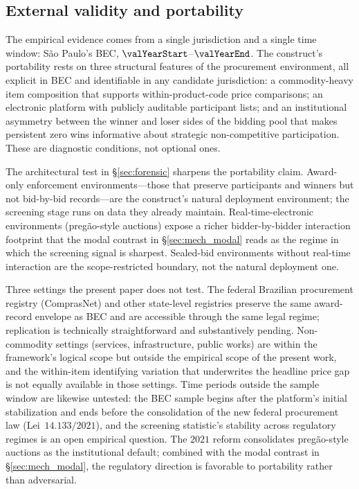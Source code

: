 \subsection{External validity and portability}
\label{sec:lim_external}

The empirical evidence comes from a single jurisdiction and a
single time window: São Paulo's BEC, $\valYearStart$--$\valYearEnd$.
The construct's portability rests on three structural features
of the procurement environment, all explicit in BEC and
identifiable in any candidate jurisdiction: a commodity-heavy
item composition that supports within-product-code price
comparisons; an electronic platform with publicly auditable
participant lists; and an institutional asymmetry between the
winner and loser sides of the bidding pool that makes persistent
zero wins informative about strategic non-competitive
participation. These are diagnostic conditions, not optional ones.

The architectural test in §\ref{sec:forensic} sharpens the
portability claim. Award-only enforcement environments---those
that preserve participants and winners but not bid-by-bid
records---are the construct's natural deployment environment;
the screening stage runs on data they already maintain.
Real-time-electronic environments (preg\~ao-style auctions)
expose a richer bidder-by-bidder interaction footprint that the
modal contrast in §\ref{sec:mech_modal} reads as the regime in
which the screening signal is sharpest. Sealed-bid environments
without real-time interaction are the scope-restricted boundary,
not the natural deployment one.

Three settings the present paper does not test. The federal
Brazilian procurement registry (ComprasNet) and other state-level
registries preserve the same award-record envelope as BEC and
are accessible through the same legal regime; replication is
technically straightforward and substantively pending.
Non-commodity settings (services, infrastructure, public works)
are within the framework's logical scope but outside the
empirical scope of the present work, and the within-item
identifying variation that underwrites the headline price gap
is not equally available in those settings. Time periods
outside the sample window are likewise untested: the BEC sample
begins after the platform's initial stabilization and ends
before the consolidation of the new federal procurement law
(Lei~$14.133/2021$), and the screening statistic's stability
across regulatory regimes is an open empirical question. The
$2021$ reform consolidates preg\~ao-style auctions as the
institutional default; combined with the modal contrast in
§\ref{sec:mech_modal}, the regulatory direction is favorable
to portability rather than adversarial.

